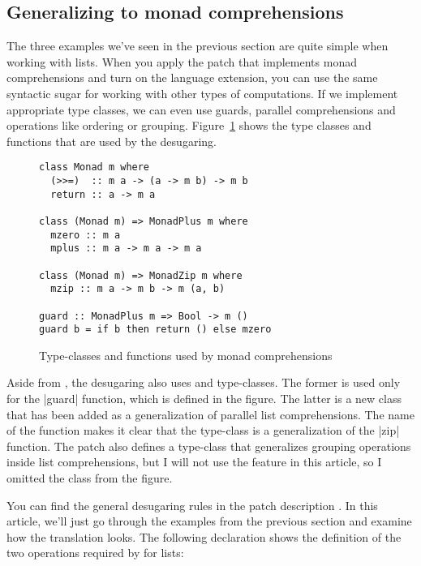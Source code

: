 \documentclass{tmr}
\begin{document}

\subsection{Generalizing to monad comprehensions}
The three examples we've seen in the previous section are quite simple when working with lists.
When you apply the patch that implements monad comprehensions \cite{bringbackmc} and turn on the
 language extension, you can use the same syntactic sugar for working
with other types of computations. If we implement appropriate type classes, we can even use guards,
parallel comprehensions and operations like ordering or grouping. Figure~\ref{fig:monad-defs} shows 
the type classes and functions that are used by the desugaring.

\begin{figure}
\begin{verbatim}
class Monad m where
  (>>=)  :: m a -> (a -> m b) -> m b
  return :: a -> m a

class (Monad m) => MonadPlus m where
  mzero :: m a
  mplus :: m a -> m a -> m a

class (Monad m) => MonadZip m where
  mzip :: m a -> m b -> m (a, b)

guard :: MonadPlus m => Bool -> m ()
guard b = if b then return () else mzero
\end{verbatim}
\caption{Type-classes and functions used by monad comprehensions}
\label{fig:monad-defs}
\end{figure}

Aside from , the desugaring also uses  and  
type-classes. The former is used only for the |guard| function, which is defined in the 
figure. The latter is a new class that has been added as a generalization of parallel
list comprehensions. The name of the function makes it clear that the type-class is a generalization
of the |zip| function. The patch also defines a  type-class that generalizes 
grouping operations inside list comprehensions, but I will not use the feature in this article, 
so I omitted the class from the figure.

You can find the general desugaring rules in the patch description \cite{bringbackmc}. In this 
article, we'll just go through the examples from the previous section and examine how the 
translation looks. The following declaration shows the definition of the two operations required 
by  for lists:
\end{document}
